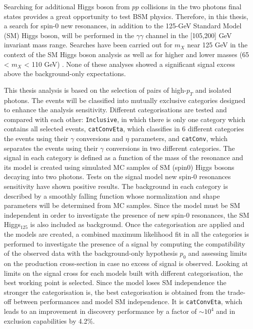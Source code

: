 \documentclass[a4paper, oneside, 11pt, openright]{book}
\begin{document}
		Searching for additional Higgs boson from $pp$ collisions in the two photons final states provides a great opportunity to test BSM physics. Therefore, in this thesis, a search for spin-0 new resonances, in addition to the 125-GeV Standard Model (SM) Higgs boson, will be performed in the $\gamma\gamma$ channel in the [105,200] GeV invariant mass range. Searches have been carried out for $m_X$ near 125 GeV in the context of the SM Higgs boson analysis \cite{Lanyov_2014} as well as for higher \cite{2021136651}\cite{2017105} and lower masses (65 < $m_X$ < 110 GeV) \cite{ATLAS-CONF-2018-025}. None of these analyses showed a significant signal excess above the background-only expectations.  
		
		This thesis analysis is based on the selection of pairs of high-$p_T$ and isolated photons. The events will be classified into mutually exclusive categories designed to enhance the analysis sensitivity. Different categorisations are tested and compared with each other: \texttt{Inclusive}, in which there is only one category which contains all selected events, \texttt{catConvEta}, which classifies in 6 different categories the events using their $\gamma$ conversions and $\eta$ parameters, and \texttt{catConv}, which separates the events using their $\gamma$ conversions in two different categories. The signal in each category is defined as a function of the mass of the resonance and its model is created using simulated MC samples of SM (spin0) Higgs bosons decaying into two photons. Tests on the signal model new spin-0 resonances sensitivity have shown positive results. The background in each category is described by a smoothly falling function whose normalization and shape parameters will be determined from MC samples. Since the model must be SM independent in order to investigate the presence of new spin-0 resonances, the SM Higgs$_{125}$ is also included as background. Once the categorisation are applied and the models are created, a combined maximum likelihood fit in all the categories is performed to investigate the presence of a signal by computing the compatibility of the observed data with the background-only hypothesis $p_0$ \cite{Statistic} and assessing limits \cite{Statistic} on the production cross-section in case no excess of signal is observed. Looking at limits on the signal cross for each models built with different categorisation, the best working point is selected. Since the model loses SM independence the stronger the categorisation is, the best categorisation is obtained from the trade-off between performances and model SM independence. It is \texttt{catConvEta}, which leads to an improvement in discovery performance by a factor of $\sim10^{4}$ and in exclusion capabilities by 4.2\%.
		
\end{document}
